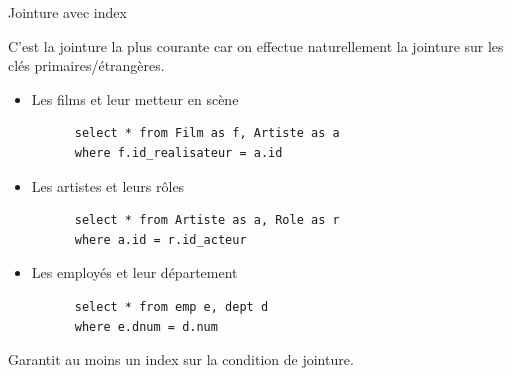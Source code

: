 \begin{frame}[fragile]{Jointure avec index}

C'est la jointure la plus \alert{courante} car on effectue
\alert{naturellement} la jointure sur les clés primaires/étrangères.

\begin{itemize}

 \item Les films et leur metteur en scène
 
\begin{verbatim}
      select * from Film as f, Artiste as a 
      where f.id_realisateur = a.id
\end{verbatim}
      
 \item Les artistes et leurs rôles      
 
 \begin{verbatim}
      select * from Artiste as a, Role as r
      where a.id = r.id_acteur
\end{verbatim}

      
 \item Les employés et leur département

\begin{verbatim}
      select * from emp e, dept d
      where e.dnum = d.num
\end{verbatim}

\end{itemize}

Garantit \alert{au moins} un index sur la condition de jointure.
\end{frame}

